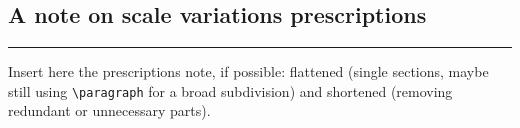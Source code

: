 \subsection{A note on scale variations prescriptions}
\label{sec:pine/mhou-scvar-note}

\vspace*{20pt}
\noindent
\rule{\hsize}{1pt}

Insert here the prescriptions note, if possible: flattened (single sections,
maybe still using \lstinline{\paragraph} for a broad subdivision) and shortened
(removing redundant or unnecessary parts).
